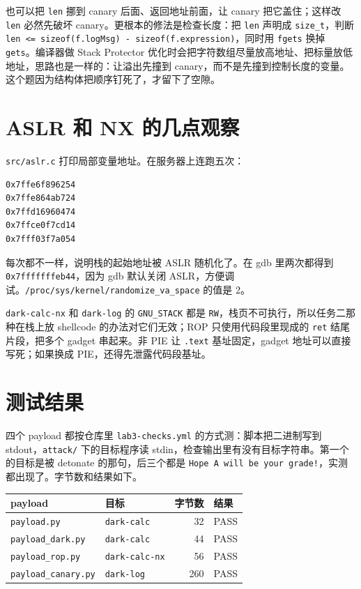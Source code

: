 \documentclass[UTF8,11pt,fontset=fandol]{ctexart}
\newcommand{\code}[1]{\texttt{#1}}
\begin{document}
也可以把 \code{len} 挪到 canary 后面、返回地址前面，让 canary 把它盖住；这样改 \code{len} 必然先破坏 canary。更根本的修法是检查长度：把 \code{len} 声明成 \code{size\_t}，判断 \code{len <= sizeof(f.logMsg) - sizeof(f.expression)}，同时用 \code{fgets} 换掉 \code{gets}。编译器做 Stack Protector 优化时会把字符数组尽量放高地址、把标量放低地址，思路也是一样的：让溢出先撞到 canary，而不是先撞到控制长度的变量。这个题因为结构体把顺序钉死了，才留下了空隙。

\section{ASLR 和 NX 的几点观察}

\code{src/aslr.c} 打印局部变量地址。在服务器上连跑五次：

\begin{lstlisting}
0x7ffe6f896254
0x7ffe864ab724
0x7ffd16960474
0x7ffce0f7cd14
0x7fff03f7a054
\end{lstlisting}

每次都不一样，说明栈的起始地址被 ASLR 随机化了。在 gdb 里两次都得到 \code{0x7fffffffeb44}，因为 gdb 默认关闭 ASLR，方便调试。\code{/proc/sys/kernel/randomize\_va\_space} 的值是 2。

\code{dark-calc-nx} 和 \code{dark-log} 的 \code{GNU\_STACK} 都是 \code{RW}，栈页不可执行，所以任务二那种在栈上放 shellcode 的办法对它们无效；ROP 只使用代码段里现成的 \code{ret} 结尾片段，把多个 gadget 串起来。非 PIE 让 \code{.text} 基址固定，gadget 地址可以直接写死；如果换成 PIE，还得先泄露代码段基址。

\section{测试结果}

四个 payload 都按仓库里 \code{lab3-checks.yml} 的方式测：脚本把二进制写到 stdout，\code{attack/} 下的目标程序读 stdin，检查输出里有没有目标字符串。第一个的目标是被 detonate 的那句，后三个都是 \code{Hope A will be your grade!}，实测都出现了。字节数和结果如下。

\begin{center}
\begin{tabular}{@{}llrl@{}}
\toprule
payload & 目标 & 字节数 & 结果\\
\midrule
\code{payload.py} & \code{dark-calc} & 32 & PASS\\
\code{payload\_dark.py} & \code{dark-calc} & 44 & PASS\\
\code{payload\_rop.py} & \code{dark-calc-nx} & 56 & PASS\\
\code{payload\_canary.py} & \code{dark-log} & 260 & PASS\\
\bottomrule
\end{tabular}
\end{center}
\end{document}
